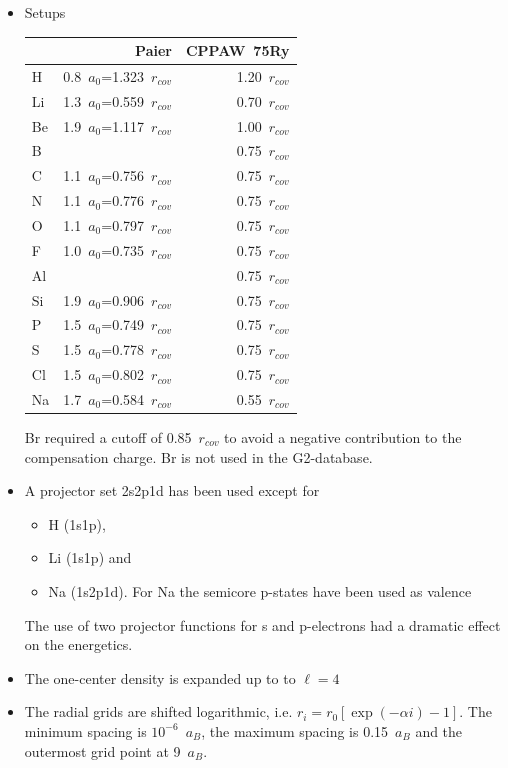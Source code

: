 \documentclass{book}
\begin{document}
\begin{itemize}
\item Setups \\
\begin{center}
\begin{tabular}{|l|r|r|}
\hline
& Paier\cite{paier05_jcp122_234102}  & CPPAW~75Ry\\
\hline
H  & 0.8~$a_0$=1.323~$r_{cov}$ & 1.20~$r_{cov}$ \\
Li & 1.3~$a_0$=0.559~$r_{cov}$ & 0.70~$r_{cov}$ \\
Be & 1.9~$a_0$=1.117~$r_{cov}$ & 1.00~$r_{cov}$ \\
B  &                          & 0.75~$r_{cov}$ \\
C  & 1.1~$a_0$=0.756~$r_{cov}$ & 0.75~$r_{cov}$ \\
N  & 1.1~$a_0$=0.776~$r_{cov}$ & 0.75~$r_{cov}$ \\
O  & 1.1~$a_0$=0.797~$r_{cov}$ & 0.75~$r_{cov}$ \\
F  & 1.0~$a_0$=0.735~$r_{cov}$ & 0.75~$r_{cov}$ \\
Al &                          & 0.75~$r_{cov}$ \\
Si & 1.9~$a_0$=0.906~$r_{cov}$ & 0.75~$r_{cov}$ \\
P  & 1.5~$a_0$=0.749~$r_{cov}$ & 0.75~$r_{cov}$ \\
S  & 1.5~$a_0$=0.778~$r_{cov}$ & 0.75~$r_{cov}$ \\
Cl & 1.5~$a_0$=0.802~$r_{cov}$ & 0.75~$r_{cov}$ \\
Na & 1.7~$a_0$=0.584~$r_{cov}$ & 0.55~$r_{cov}$ \\
\hline
\end{tabular}
\end{center}
Br required a cutoff of 0.85~$r_{cov}$ to avoid a negative
contribution to the compensation charge. Br is not used in the
G2-database.
%
\item A projector set 2s2p1d has been used except for 
\begin{itemize}
  \item H (1s1p), 
  \item Li (1s1p) and 
  \item Na (1s2p1d). For Na the semicore p-states have been used as valence
\end{itemize}
The use of two projector functions for s and p-electrons had a
dramatic effect on the energetics.
%
\item The one-center density is expanded up to to $\ell=4$
%
\item The radial grids are shifted logarithmic, i.e.
  $r_i=r_0[\exp(-\alpha i)-1]$. The minimum spacing is
  $10^{-6}$~$a_B$, the maximum spacing is 0.15~$a_B$ and the outermost
  grid point at 9~$a_B$.
\end{itemize}
\end{document}
